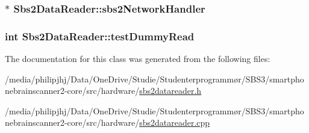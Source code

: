 \hypertarget{classSbs2DataReader_afb837cc5dbf1d189a64f47e76878bf4c}{
\subsubsection[{sbs2\-Network\-Handler}]{$\ast$ Sbs2\-Data\-Reader\-::sbs2\-Network\-Handler\hspace{0.3cm}{\ttfamily [protected]}}}\label{classSbs2DataReader_afb837cc5dbf1d189a64f47e76878bf4c}
\hypertarget{classSbs2DataReader_a7c66f0a2da31e3c186bfb3ac7da13ecb}{
\subsubsection[{test\-Dummy\-Read}]{\setlength{\rightskip}{0pt plus 5cm}int Sbs2\-Data\-Reader\-::test\-Dummy\-Read\hspace{0.3cm}{\ttfamily [protected]}}}\label{classSbs2DataReader_a7c66f0a2da31e3c186bfb3ac7da13ecb}


The documentation for this class was generated from the following files\-:\begin{DoxyCompactItemize}
\item 
/media/philipjhj/\-Data/\-One\-Drive/\-Studie/\-Studenterprogrammør/\-S\-B\-S3/smartphonebrainscanner2-\/core/src/hardware/\hyperlink{sbs2datareader_8h}{sbs2datareader.\-h}\item 
/media/philipjhj/\-Data/\-One\-Drive/\-Studie/\-Studenterprogrammør/\-S\-B\-S3/smartphonebrainscanner2-\/core/src/hardware/\hyperlink{sbs2datareader_8cpp}{sbs2datareader.\-cpp}\end{DoxyCompactItemize}
